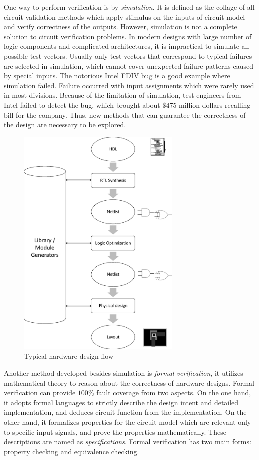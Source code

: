 One way to perform verification is by {\it simulation}. It is defined as the collage of all circuit validation 
methods which apply stimulus on the inputs of circuit model and verify correctness of the outputs.
However, simulation is not a complete solution to circuit verification problems. In modern designs with 
large number of logic components and complicated architectures, it is impractical to simulate all possible 
test vectors. Usually only test vectors that correspond to typical failures are selected in simulation, which 
cannot cover unexpected failure patterns caused by special inputs. The notorious Intel FDIV bug \cite{nicely:FDIV}
is a good example where simulation failed. Failure occurred with input assignments which were rarely used in most divisions. Because of the limitation of simulation,  
test engineers from Intel failed to detect the bug,  which brought about $\$475$ million dollars recalling bill
for the company. Thus,  new methods that can guarantee the correctness of the design are necessary to be explored.

{
\begin{figure}[h]
\centerline{
\includegraphics[width=0.7\textwidth]{newfig/designflow.eps}
}
\caption{Typical hardware design flow}
\label{fig:designflow}
\end{figure}
}

Another method developed besides simulation is \emph{formal verification}, it utilizes 
mathematical theory to reason about the correctness of hardware designs.
Formal verification can provide $100\%$ fault coverage from two aspects. On the one hand,  
it adopts formal languages to strictly describe the design intent and detailed implementation, 
and deduces circuit function from the implementation.
On the other hand,  it formalizes properties
for the circuit model which are relevant only to specific input signals,  and prove the properties mathematically. 
These descriptions are named as {\it specifications}.
Formal verification has two main forms: property checking and equivalence 
checking. 

